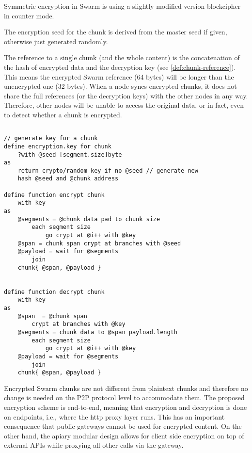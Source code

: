 
Symmetric encryption in Swarm is using a slightly modified version blockcipher in counter mode.

The encryption seed for the chunk is derived from the master seed if given, otherwise just generated randomly. 

The reference to a single chunk (and the whole content) is the concatenation of the hash of encrypted data and the decryption key (see \ref{def:chunk-reference}). This means the encrypted Swarm reference (64 bytes) will be longer than the unencrypted one (32 bytes). When a node syncs encrypted chunks, it does not share the full references (or the decryption keys) with the other nodes in any way.  Therefore, other nodes will be unable to access the original data, or in fact, even to detect whether a chunk is encrypted.

\begin{definition}\label{def:encrypt}
\begin{lstlisting}[language=buzz1]

// generate key for a chunk
define encryption.key for chunk
    ?with @seed [segment.size]byte
as
    return crypto/random key if no @seed // generate new 
    hash @seed and @chunk address

define function encrypt chunk
    with key 
as   
    @segments = @chunk data pad to chunk size
        each segment size 
            go crypt at @i++ with @key 
    @span = chunk span crypt at branches with @seed 
    @payload = wait for @segments 
        join
    chunk{ @span, @payload } 


define function decrypt chunk
    with key 
as       
    @span  = @chunk span 
        crypt at branches with @key 
    @segments = chunk data to @span payload.length
        each segment size 
            go crypt at @i++ with @key
    @payload = wait for @segments 
        join
    chunk{ @span, @payload } 

\end{lstlisting}
\end{definition} 
       
        
Encrypted Swarm chunks are not different from plaintext chunks and therefore no change is needed on the P2P protocol level to accommodate them. The proposed encryption scheme is end-to-end, meaning that encryption and decryption is done on endpoints, i.e., where the http proxy layer runs. This has an important consequence that public gateways cannot be used for encrypted content. On the other hand, the apiary modular design allows for client side encryption on top of external  APIs while proxying all other calls via the gateway.

